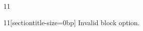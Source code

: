 \documentclass[paper=A4]{ropas-poster}
\begin{document}
\begin{postergrid}{1}{1}
\begin{posterblock}{1}{1}[sectiontitle-size=0bp]
Invalid block option.
\end{posterblock}
\end{postergrid}
\end{document}
